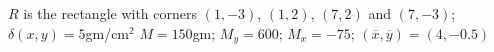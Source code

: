 {$R$ is the rectangle with corners $(1,-3)$, $(1,2)$, $(7,2)$ and $(7,-3)$; $\delta(x,y) = 5$gm/cm$^2$\label{ex_13_04_ex_11}
}
{$M = 150$gm;  $M_y=600$; $M_x=-75$; $(\overline{x},\overline{y}) = (4,-0.5)$
}